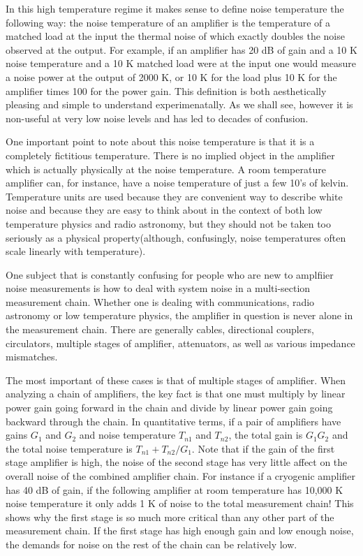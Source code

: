 \documentclass[11pt]{article}
\begin{document}
    	In this high temperature regime it makes sense to define noise temperature the following way:  the noise temperature of an amplifier is the temperature of a matched load at the input the thermal noise of which exactly doubles the noise observed at the output.  For example, if an amplifier has 20 dB of gain and a 10 K noise temperature and a 10 K matched load were at the input one would measure a noise power at the output of 2000 K, or 10 K for the load plus 10 K for the amplifier times 100 for the power gain.  This definition is both aesthetically pleasing and simple to understand experimenatally.  As we shall see, however it is non-useful at very low noise levels and has led to decades of confusion.  





	One important point to note about this noise temperature is that it is a completely fictitious temperature.  There is no implied object in the amplifier which is actually physically at the noise temperature.  A room temperature amplifier can, for instance, have a noise temperature of just a few 10's of kelvin.  Temperature units are used because they are convenient way to describe white noise and because they are easy to think about in the context of both low temperature physics and radio astronomy, but they should not be taken too seriously as a physical property(although, confusingly, noise temperatures often scale linearly with temperature).  




    	One subject that is constantly confusing for people who are new to amplfiier noise measurements is how to deal with system noise in a multi-section measurement chain.  Whether one is dealing with communications, radio astronomy or low temperature physics, the amplifier in question is never alone in the measurement chain.  There are generally cables, directional couplers, circulators, multiple stages of amplifier, attenuators, as well as various impedance mismatches.  




    	The most important of these cases is that of multiple stages of amplifier.  When analyzing a chain of amplifiers, the key fact is that one must multiply by linear power gain going forward in the chain and divide by linear power gain going backward through the chain.  In quantitative terms, if a pair of amplifiers have gains $G_1$ and $G_2$ and noise temperature $T_{n1}$ and $T_{n2}$, the total gain is $G_1G_2$ and the total noise temperature is $T_{n1} + T_{n2}/G_1$.  Note that if the gain of the first stage amplifier is high, the noise of the second stage has very little affect on the overall noise of the combined amplifier chain.  For instance if a cryogenic amplifier has 40 dB of gain, if the following amplifier at room temperature has 10,000 K noise temperature it only adds 1 K of noise to the total measurement chain!  This shows why the first stage is so much more critical than any other part of the measurement chain.  If the first stage has high enough gain and low enough noise, the demands for noise on the rest of the chain can be relatively low.  
\end{document}
